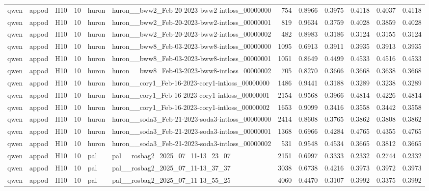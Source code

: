 \begin{table}[tbp]
\begin{tabular}{lllrllrrrrrr}
qwen & appod & H10 & 10 & huron & huron\_\_bww2\_Feb-20-2023-bww2-intloss\_00000000 & 754 & 0.8966 & 0.3975 & 0.4118 & 0.4037 & 0.4118 \\
qwen & appod & H10 & 10 & huron & huron\_\_bww2\_Feb-20-2023-bww2-intloss\_00000001 & 819 & 0.9634 & 0.3759 & 0.4028 & 0.3859 & 0.4028 \\
qwen & appod & H10 & 10 & huron & huron\_\_bww2\_Feb-20-2023-bww2-intloss\_00000002 & 482 & 0.8983 & 0.3186 & 0.3124 & 0.3155 & 0.3124 \\
qwen & appod & H10 & 10 & huron & huron\_\_bww8\_Feb-03-2023-bww8-intloss\_00000000 & 1095 & 0.6913 & 0.3911 & 0.3935 & 0.3913 & 0.3935 \\
qwen & appod & H10 & 10 & huron & huron\_\_bww8\_Feb-03-2023-bww8-intloss\_00000001 & 1051 & 0.8649 & 0.4499 & 0.4533 & 0.4516 & 0.4533 \\
qwen & appod & H10 & 10 & huron & huron\_\_bww8\_Feb-03-2023-bww8-intloss\_00000002 & 705 & 0.8270 & 0.3666 & 0.3668 & 0.3638 & 0.3668 \\
qwen & appod & H10 & 10 & huron & huron\_\_cory1\_Feb-16-2023-cory1-intloss\_00000000 & 1486 & 0.9441 & 0.3188 & 0.3289 & 0.3238 & 0.3289 \\
qwen & appod & H10 & 10 & huron & huron\_\_cory1\_Feb-16-2023-cory1-intloss\_00000001 & 2154 & 0.9568 & 0.3966 & 0.4814 & 0.4226 & 0.4814 \\
qwen & appod & H10 & 10 & huron & huron\_\_cory1\_Feb-16-2023-cory1-intloss\_00000002 & 1653 & 0.9099 & 0.3416 & 0.3558 & 0.3442 & 0.3558 \\
qwen & appod & H10 & 10 & huron & huron\_\_soda3\_Feb-21-2023-soda3-intloss\_00000000 & 2414 & 0.8608 & 0.3765 & 0.3862 & 0.3808 & 0.3862 \\
qwen & appod & H10 & 10 & huron & huron\_\_soda3\_Feb-21-2023-soda3-intloss\_00000001 & 1368 & 0.6966 & 0.4284 & 0.4765 & 0.4355 & 0.4765 \\
qwen & appod & H10 & 10 & huron & huron\_\_soda3\_Feb-21-2023-soda3-intloss\_00000002 & 531 & 0.9548 & 0.4534 & 0.3665 & 0.3812 & 0.3665 \\
qwen & appod & H10 & 10 & pal & pal\_\_rosbag2\_2025\_07\_11-13\_23\_07 & 2151 & 0.6997 & 0.3333 & 0.2332 & 0.2744 & 0.2332 \\
qwen & appod & H10 & 10 & pal & pal\_\_rosbag2\_2025\_07\_11-13\_37\_37 & 3038 & 0.6738 & 0.4216 & 0.3973 & 0.3972 & 0.3973 \\
qwen & appod & H10 & 10 & pal & pal\_\_rosbag2\_2025\_07\_11-13\_55\_25 & 4060 & 0.4470 & 0.3107 & 0.3992 & 0.3375 & 0.3992 \\

\end{tabular}
\end{table}
